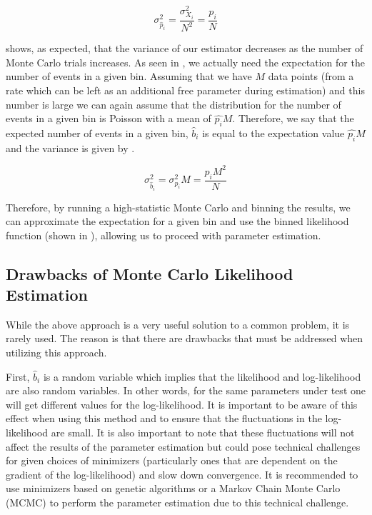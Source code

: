 \begin{equation}
        \label{eqn:gpu_prob_var}
        \sigma_{\hat{p}_i}^2 = \frac{\sigma_{X_i}^2}{N^2} = \frac{p_i}{N}
\end{equation}

 shows, as expected, that the variance of our estimator decreases as the number of Monte Carlo trials increases.  As seen in , we actually need the expectation for the number of events in a given bin.  Assuming that we have $M$ data points (from a rate which can be left as an additional free parameter during estimation) and this number is large we can again assume that the distribution for the number of events in a given bin is Poisson with a mean of $\hat{p_i} M$.  Therefore, we say that the expected number of events in a given bin, $\hat{b}_i$ is equal to the expectation value $\hat{p_i} M$ and the variance is given by .


\begin{equation}
        \label{eqn:gpu_bin_count_var}
         \sigma_{\hat{b}_i}^2 = \sigma_{p_i}^2 M = \frac{p_i M^2}{N}
\end{equation}

Therefore, by running a high-statistic Monte Carlo and binning the results, we can approximate the expectation for a given bin and use the binned likelihood function (shown in ), allowing us to proceed with parameter estimation.



\subsection{Drawbacks of Monte Carlo Likelihood Estimation}


While the above approach is a very useful solution to a common problem, it is rarely used.  The reason is that there are drawbacks that must be addressed when utilizing this approach.

First, $\hat{b}_i$ is a random variable which implies that the likelihood and log-likelihood are also random variables.  In other words, for the same parameters under test one will get different values for the log-likelihood.  It is important to be aware of this effect when using this method and to ensure that the fluctuations in the log-likelihood are small.  It is also important to note that these fluctuations will not affect the results of the parameter estimation but could pose technical challenges for given choices of minimizers (particularly ones that are dependent on the gradient of the log-likelihood) and slow down convergence.  It is recommended to use minimizers based on genetic algorithms or a Markov Chain Monte Carlo (MCMC) to perform the parameter estimation due to this technical challenge.

